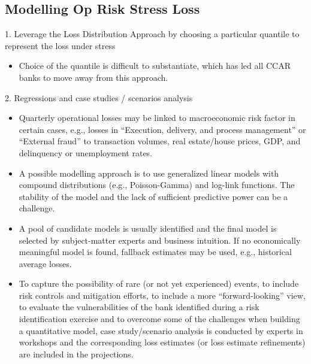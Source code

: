 \subsection*{Modelling Op Risk Stress Loss}
1. Leverage the Loss Distribution Approach by choosing a particular quantile to represent the loss under stress
\begin{itemize}[leftmargin=*]
    \item Choice of the quantile is difficult to substantiate, which has led all CCAR banks to move away from this approach.
\end{itemize}
2. Regressions and case studies / scenarios analysis
\begin{itemize}[leftmargin=*]
    \item Quarterly operational losses may be linked to macroeconomic risk factor in certain cases, e.g., losses in “Execution, delivery, and process
management” or “External fraud” to transaction volumes, real estate/house prices, GDP, and delinquency or unemployment rates.
    \item A possible modelling approach is to use generalized linear models with compound distributions (e.g., Poisson-Gamma) and log-link
functions. The stability of the model and the lack of sufficient predictive power can be a challenge.
    \item A pool of candidate models is usually identified and the final model is selected by subject-matter experts and business intuition. If no
economically meaningful model is found, fallback estimates may be used, e.g., historical average losses.
    \item To capture the possibility of rare (or not yet experienced) events, to include risk controls and mitigation efforts, to include a more
“forward-looking” view, to evaluate the vulnerabilities of the bank identified during a risk identification exercise and to overcome some of
the challenges when building a quantitative model, case study/scenario analysis is conducted by experts in workshops and the
corresponding loss estimates (or loss estimate refinements) are included in the projections.
\end{itemize}




